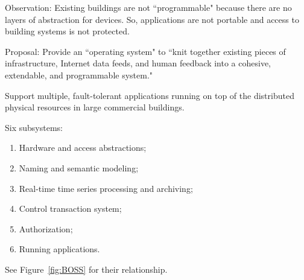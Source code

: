 Observation:  Existing buildings are not ``programmable" because there are no layers of abstraction for devices.  So, applications are not portable and access to building systems is not protected.

Proposal: Provide an ``operating system" to ``knit together existing pieces of infrastructure, Internet data feeds, and human feedback into a cohesive, extendable, and programmable system." 

Support multiple, fault-tolerant applications running on top of the distributed physical resources in large commercial buildings. 

Six subsystems:
\begin{enumerate}
\item Hardware and access abstractions;
\item Naming and semantic modeling;
\item Real-time time series processing and archiving;
\item Control transaction system;
\item Authorization;
\item Running applications.
\end{enumerate}

See Figure~\ref{fig:BOSS} for their relationship. 